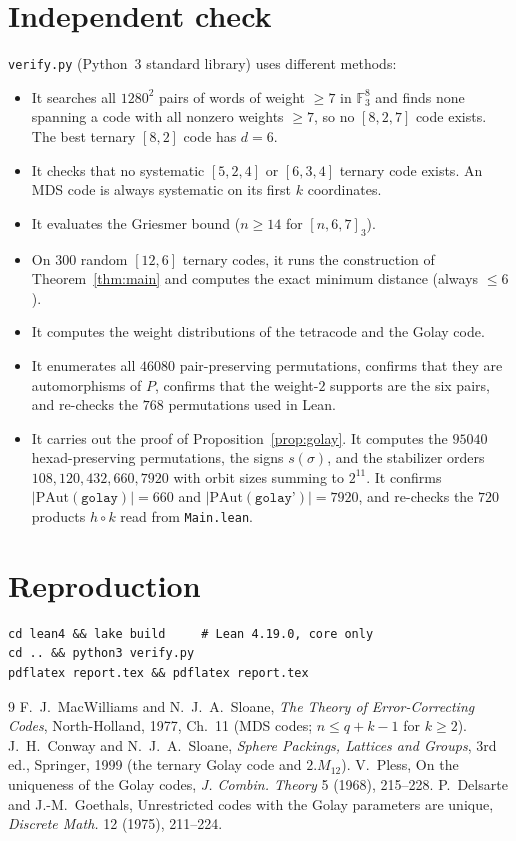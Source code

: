 \documentclass[11pt]{article}
\theoremstyle{remark}
\newcommand{\F}{\mathbb{F}_3}
\begin{document}
\section{Independent check}
\texttt{verify.py} (Python~3 standard library) uses different methods:
\begin{itemize}
\item It searches all $1280^2$ pairs of words of weight $\ge7$ in $\F^8$ and finds
none spanning a code with all nonzero weights $\ge7$, so no $[8,2,7]$ code
exists. The best ternary $[8,2]$ code has $d=6$.
\item It checks that no systematic $[5,2,4]$ or $[6,3,4]$ ternary code exists.
An MDS code is always systematic on its first $k$ coordinates.
\item It evaluates the Griesmer bound ($n\ge14$ for $[n,6,7]_3$).
\item On $300$ random $[12,6]$ ternary codes, it runs the construction of
Theorem~\ref{thm:main} and computes the exact minimum distance (always
$\le6$).
\item It computes the weight distributions of the tetracode and the Golay code.
\item It enumerates all $46080$ pair-preserving permutations, confirms that they
are automorphisms of $P$, confirms that the weight-$2$ supports are the six pairs,
and re-checks the $768$ permutations used in Lean.
\item It carries out the proof of Proposition~\ref{prop:golay}. It computes the
$95040$ hexad-preserving permutations, the signs $s(\sigma)$, and the
stabilizer orders $108,120,432,660,7920$ with orbit sizes summing to
$2^{11}$. It confirms $|\mathrm{PAut}(\texttt{golay})|=660$ and
$|\mathrm{PAut}(\texttt{golay'})|=7920$, and re-checks the $720$ products
$h\circ k$ read from \texttt{Main.lean}.
\end{itemize}

\section{Reproduction}
\begin{verbatim}
cd lean4 && lake build     # Lean 4.19.0, core only
cd .. && python3 verify.py
pdflatex report.tex && pdflatex report.tex
\end{verbatim}

\begin{thebibliography}{9}
 F.~J.~MacWilliams and N.~J.~A.~Sloane, \emph{The Theory of
Error-Correcting Codes}, North-Holland, 1977, Ch.~11 (MDS codes; $n\le q+k-1$
for $k\ge2$).
 J.~H.~Conway and N.~J.~A.~Sloane, \emph{Sphere Packings, Lattices
and Groups}, 3rd ed., Springer, 1999 (the ternary Golay code and $2.M_{12}$).
 V.~Pless, On the uniqueness of the Golay codes, \emph{J.
Combin. Theory} 5 (1968), 215--228.
 P.~Delsarte and J.-M.~Goethals, Unrestricted codes with the Golay
parameters are unique, \emph{Discrete Math.} 12 (1975), 211--224.
\end{thebibliography}
\end{document}
